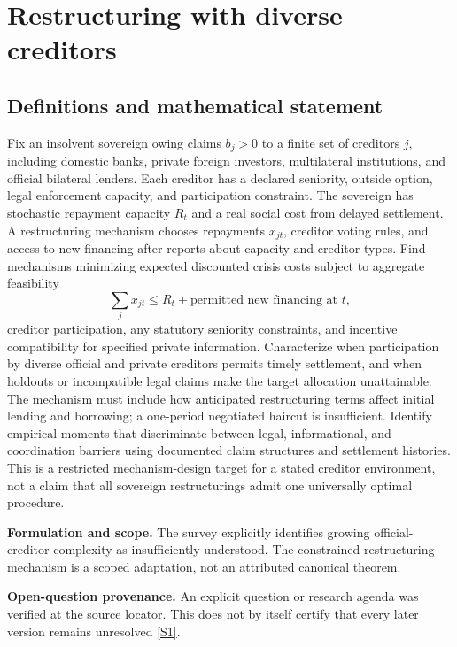 \documentclass[11pt]{article}
\newcommand{\sref}[2]{\hyperlink{source:#1:#2}{[S#2]}}
\begin{document}
\section*{Restructuring with diverse creditors}\label{30007537}
\subsection{Definitions and mathematical statement}
Fix an insolvent sovereign owing claims \(b_j>0\) to a finite set of creditors \(j\), including domestic banks, private foreign investors, multilateral institutions, and official bilateral lenders. Each creditor has a declared seniority, outside option, legal enforcement capacity, and participation constraint. The sovereign has stochastic repayment capacity \(R_t\) and a real social cost from delayed settlement. A restructuring mechanism chooses repayments \(x_{jt}\), creditor voting rules, and access to new financing after reports about capacity and creditor types.
Find mechanisms minimizing expected discounted crisis costs subject to aggregate feasibility
\[
\sum_j x_{jt}\le R_t+\text{permitted new financing at }t,
\]
creditor participation, any statutory seniority constraints, and incentive compatibility for specified private information. Characterize when participation by diverse official and private creditors permits timely settlement, and when holdouts or incompatible legal claims make the target allocation unattainable. The mechanism must include how anticipated restructuring terms affect initial lending and borrowing; a one-period negotiated haircut is insufficient. Identify empirical moments that discriminate between legal, informational, and coordination barriers using documented claim structures and settlement histories. This is a restricted mechanism-design target for a stated creditor environment, not a claim that all sovereign restructurings admit one universally optimal procedure.

\par\textbf{Formulation and scope.} The survey explicitly identifies growing official-creditor complexity as insufficiently understood. The constrained restructuring mechanism is a scoped adaptation, not an attributed canonical theorem.

\par\textbf{Open-question provenance.} An explicit question or research agenda was verified at the source locator. This does not by itself certify that every later version remains unresolved \sref{30007537}{1}.
\end{document}
